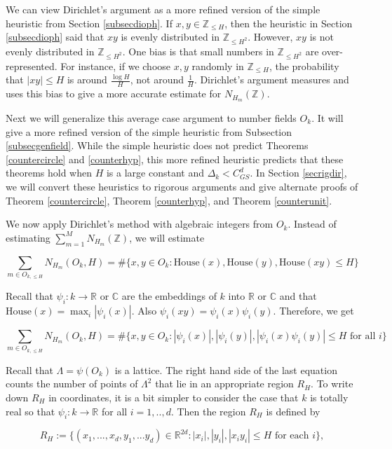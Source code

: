 \documentclass{amsart}
\newcommand{\CC}{\mathbb{C}}
\newcommand{\ZZ}{\mathbb{Z}}
\newcommand{\RR}{\mathbb{R}}
\newcommand{\house}{\textrm{House}}
\begin{document}
We can view Dirichlet's argument as a more refined version of the simple heuristic from Section \ref{subsecdioph}.   If $x,y \in \ZZ_{\le H}$,  then the heuristic in Section \ref{subsecdioph} said that $xy$ is evenly distributed in $\ZZ_{\le H^2}$.  However,  $xy$ is not evenly distributed in $\ZZ_{\le H^2}$.   One bias is that small numbers in $\ZZ_{\le H^2}$ are over-represented.   For instance, if we choose $x,y$ randomly in $\ZZ_{\le H}$,  the probability that $|xy| \le H$ is around $\frac{ \log H}{H}$, not around $\frac{1}{H}$.  
Dirichlet's argument measures and uses this bias to give a more accurate estimate for $N_{H_m}(\ZZ)$.  

Next we will generalize this average case argument to number fields $O_k$.   It will give a more refined version of the simple heuristic from Subsection \ref{subsecgenfield}.  While the simple heuristic does not predict Theorems \ref{countercircle} and \ref{counterhyp}, this more refined heuristic predicts that these theorems hold when $H$ is a large constant and $\Delta_k < C_{GS}^d$.   In Section \ref{secrigdir},  we will convert these heuristics to rigorous arguments and give alternate proofs of Theorem \ref{countercircle},  Theorem \ref{counterhyp},  and Theorem \ref{counterunit}.

We now apply Dirichlet's method with algebraic integers from $O_k$.   Instead of estimating $\sum_{m=1}^M N_{H_m}(\ZZ)$,  we will estimate

$$ \sum_{m \in O_{k, \le H} } N_{H_m} (O_k,  H) = \# \{ x, y \in O_k: \house(x),  \house(y),  \house(xy) \le H \} $$

\noindent Recall that $\psi_i: k \rightarrow \RR$ or $\CC$ are the embeddings of $k$ into $\RR$ or $\CC$ and that $\house(x) = \max_i |\psi_i(x)|$.   Also $\psi_i(xy) = \psi_i(x) \psi_i(y)$.  Therefore,  we get

$$ \sum_{m \in O_{k, \le H} } N_{H_m} (O_k,  H) = \# \{ x, y \in O_k: |\psi_i(x)|, |\psi_i(y)|,  |\psi_i(x) \psi_i(y)| \le H \textrm{ for all } i   \} $$

Recall that $\Lambda = \psi(O_k)$ is a lattice.   The right hand side of the last equation counts the number of points of $\Lambda^2$ that lie in an appropriate region $R_H$.   To write down $R_H$ in coordinates,  it is a bit simpler to consider the case that $k$ is totally real so that $\psi_i: k \rightarrow \RR$ for all $i = 1, .., d$.   Then the region $R_H$ is  defined by 

\begin{equation} \label{defRH}
R_H := \{ (x_1, ..., x_d, y_1, ... y_d) \in \RR^{2d}: |x_i|,  |y_i|,  |x_i y_i| \le H \textrm{ for each } i \},
\end{equation}
\end{document}
